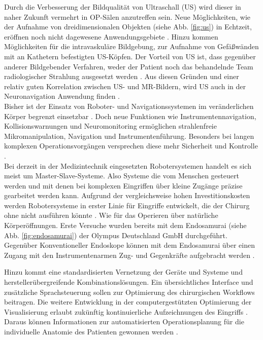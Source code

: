 Durch die Verbesserung der Bildqualität von Ultraschall (US) wird dieser in naher Zukunft vermehrt in OP-Sälen anzutreffen sein. Neue Möglichkeiten, wie der Aufnahme von dreidimensionalen Objekten (siehe Abb. \ref{fig:us}) in Echtzeit, eröffnen noch nicht dagewesene Anwendungsgebiete \cite{BrainShiftInTumorResection}. Hinzu kommen Möglichkeiten für die intravaskuläre Bildgebung, zur Aufnahme von Gefäßwänden mit an Kathetern befestigten US-Köpfen. Der Vorteil von US ist, dass gegenüber anderer Bildgebender Verfahren, weder der Patient noch das behandelnde Team radiologischer Strahlung ausgesetzt werden \cite{CurrentAndFuture}. Aus diesen Gründen und einer relativ guten Korrelation zwischen US- und MR-Bildern, wird US auch in der Neuronavigation Anwendung finden \cite{BrainShiftInTumorResection}. \\
Bisher ist der Einsatz von Roboter- und Navigationssystemen im veränderlichen Körper begrenzt einsetzbar \cite{DerDigitaleOperationssaal}. Doch neue Funktionen wie Instrumentennavigation, Kollisionswarnungen und Neuromonitoring ermöglichen strahlenfreie Mikromanipulation, Navigation und Instrumentenführung. Besonders bei langen komplexen Operationsvorgängen versprechen diese mehr Sicherheit und Kontrolle \cite{DerDigitaleOperationssaal,CurrentAndFuture}. \\
Bei derzeit in der Medizintechnik eingesetzten Robotersystemen handelt es sich meist um Master-Slave-Systeme. Also Systeme die vom Menschen gesteuert werden und mit denen bei komplexen Eingriffen über kleine Zugänge präzise gearbeitet werden kann. Aufgrund der vergleichsweise hohen Investitionskosten werden Robotersysteme in erster Linie für Eingriffe entwickelt, die der Chirurg ohne nicht ausführen könnte \cite{DerDigitaleOperationssaal}. Wie für das Operieren über natürliche Körperöffnungen. Erste Versuche wurden bereits mit dem Endosamurai (siehe Abb. \ref{fig:endosamurai}) der Olympus Deutschland GmbH durchgeführt. Gegenüber Konventioneller Endoskope können mit dem Endosamurai über einen Zugang mit den Instrumentenarmen Zug- und Gegenkräfte aufgebracht werden \cite{Endosamurai,DerDigitaleOperationssaal}. 

Hinzu kommt eine standardisierten Vernetzung der Geräte und Systeme und herstellerübergreifende Kombinationslösungen. Ein übersichtliches Interface und zusätzliche Sprachsteuerung sollen zur Optimierung des chirurgischen Workflows beitragen. Die weitere Entwicklung in der computergestützten Optimierung der Visualisierung erlaubt zukünftig kontinuierliche Aufzeichnungen des Eingriffs \cite{DerDigitaleOperationssaal}. Daraus können Informationen zur automatisierten Operationsplanung für die individuelle Anatomie des Patienten gewonnen werden \cite{CurrentAndFuture}.

